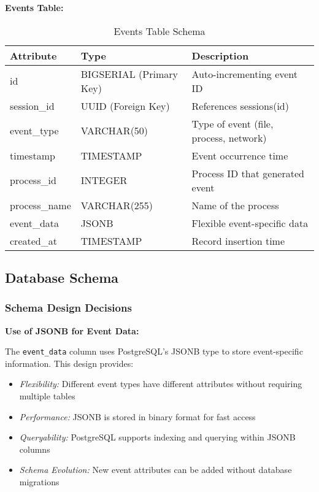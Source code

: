 \textbf{Events Table:}
\begin{table}[h]
\centering
\small
\begin{tabular}{|l|l|l|}
\hline
\textbf{Attribute} & \textbf{Type} & \textbf{Description} \\
\hline
id & BIGSERIAL (Primary Key) & Auto-incrementing event ID \\
session\_id & UUID (Foreign Key) & References sessions(id) \\
event\_type & VARCHAR(50) & Type of event (file, process, network) \\
timestamp & TIMESTAMP & Event occurrence time \\
process\_id & INTEGER & Process ID that generated event \\
process\_name & VARCHAR(255) & Name of the process \\
event\_data & JSONB & Flexible event-specific data \\
created\_at & TIMESTAMP & Record insertion time \\
\hline
\end{tabular}
\caption{Events Table Schema}
\end{table}

\subsection{Database Schema}

\subsubsection{Schema Design Decisions}

\textbf{Use of JSONB for Event Data:}

The \texttt{event\_data} column uses PostgreSQL's JSONB type to store event-specific information. This design provides:

\begin{itemize}
    \item \textit{Flexibility:} Different event types have different attributes without requiring multiple tables
    \item \textit{Performance:} JSONB is stored in binary format for fast access
    \item \textit{Queryability:} PostgreSQL supports indexing and querying within JSONB columns
    \item \textit{Schema Evolution:} New event attributes can be added without database migrations
\end{itemize}

